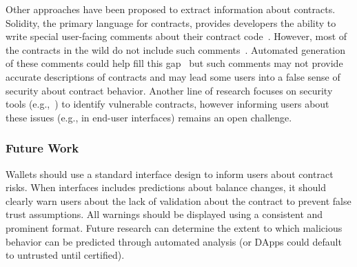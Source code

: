\documentclass[conference]{IEEEtran}
\begin{document}


Other approaches have been proposed to extract information about contracts.
Solidity, the primary language for contracts, provides developers the ability to write special user-facing comments about their contract code~\cite{solidityNatspec}.
However, most of the contracts in the wild do not include such comments~\cite{hu2021automating}.
Automated generation of these comments could help fill this gap~\cite{hu2021automating} but such comments may not provide accurate descriptions of contracts and may lead some users into a false sense of security about contract behavior.
Another line of research focuses on security tools (e.g.,~\cite{kalra2018zeus,tsankov2018security}) to identify vulnerable contracts, however informing users about these issues (e.g., in end-user interfaces) remains an open challenge.





\subsubsection*{\textbf{Future Work}}
Wallets should use a standard interface design to inform users about contract risks.
When interfaces includes predictions about balance changes, it should clearly warn users about the lack of validation about the contract to prevent false trust assumptions.
All warnings should be displayed using a consistent and prominent format.
Future research can determine the extent to which malicious behavior can be predicted through automated analysis (or DApps could default to untrusted until certified). 
\end{document}
